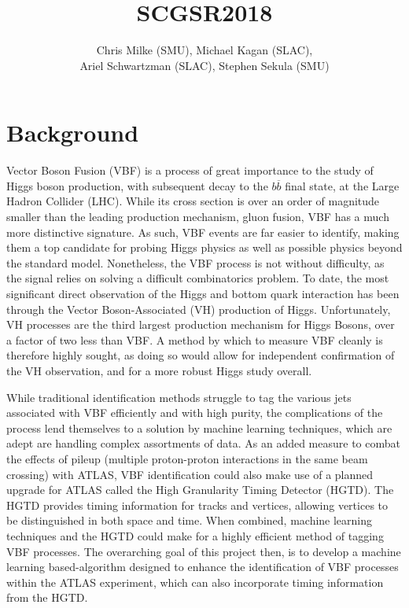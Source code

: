 \documentclass[12pt,letterpaper]{article}
\begin{document}
\pagestyle{fancy}


\pagestyle{plain}
\label{sec:coverpaqe}




\title{{\large SCGSR2018}}

\author{Chris Milke (SMU), Michael Kagan (SLAC),\\
  Ariel Schwartzman (SLAC), Stephen Sekula (SMU)}



\section*{Background}
    Vector Boson Fusion (VBF) is a process of great importance to the study of Higgs boson production, with subsequent decay to the $b\overline{b}$ final state\cite{Aaboud:2018gay}, at the Large Hadron Collider (LHC). While its cross section is over an order of magnitude smaller than the leading production mechanism, gluon fusion\cite{deFlorian:2016spz}, VBF has a much more distinctive signature. As such, VBF events are far easier to identify, making them a top candidate for probing Higgs physics as well as possible physics beyond the standard model. Nonetheless, the VBF process is not without difficulty, as the signal relies on solving a difficult combinatorics problem. To date, the most significant direct observation of the Higgs and bottom quark interaction has been through the Vector Boson-Associated (VH) production of Higgs\cite{Aaboud:2018zhk}\cite{Sirunyan:2018kst}. Unfortunately, VH processes are the third largest production mechanism for Higgs Bosons, over a factor of two less than VBF. A method by which to measure VBF cleanly is therefore highly sought, as doing so would allow for independent confirmation of the VH observation, and for a more robust Higgs study overall.  
    
    While traditional identification methods struggle to tag the various jets associated with VBF efficiently and with high purity, the complications of the process lend themselves to a solution by machine learning techniques, which are adept are handling complex assortments of data. As an added measure to combat the effects of pileup (multiple proton-proton interactions in the same beam crossing) with ATLAS, VBF identification could also make use of a planned upgrade for ATLAS called the High Granularity Timing Detector (HGTD)\cite{Collaboration:2623663}. The HGTD provides timing information for tracks and vertices, allowing vertices to be distinguished in both space and time. When combined, machine learning techniques and the HGTD could make for a highly efficient method of tagging VBF processes. The overarching goal of this project then, is to develop a machine learning based-algorithm designed to enhance the identification of VBF processes within the ATLAS experiment, which can also incorporate timing information from the HGTD.  
\end{document}
